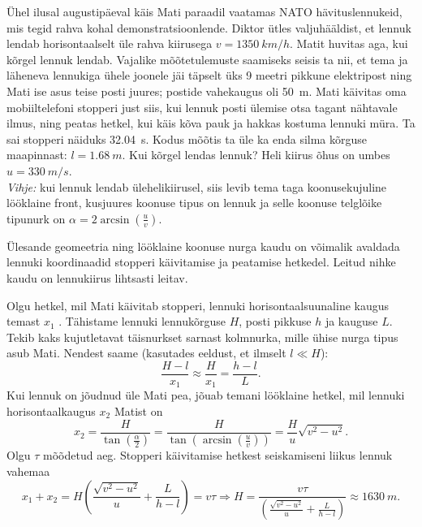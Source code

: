 
Ühel ilusal augustipäeval käis Mati paraadil vaatamas NATO hävituslennukeid, mis
tegid rahva kohal demonstratsioonlende. Diktor ütles valjuhääldist, et lennuk
lendab horisontaalselt üle rahva kiirusega $v=\SI{1350}{km/h}$. Matit huvitas aga, kui
kõrgel lennuk lendab. Vajalike mõõtetulemuste saamiseks seisis ta nii, et tema
ja läheneva lennukiga ühele joonele jäi täpselt üks 9 meetri pikkune elektripost
ning Mati ise asus teise posti juures; postide vahekaugus oli \SI{50}{m}. Mati käivitas oma
mobiiltelefoni stopperi just siis, kui lennuk posti ülemise otsa tagant nähtavale ilmus, ning 
peatas hetkel, kui käis kõva pauk ja hakkas kostuma lennuki müra. Ta sai
stopperi näiduks \SI{32,04}{s}. Kodus
mõõtis ta üle ka enda silma kõrguse maapinnast: $l=\SI{1,68}{m}$.
Kui kõrgel lendas lennuk? Heli kiirus õhus on umbes
$u=\SI{330}{m/s}$.\\ 
\textit{Vihje:} kui lennuk lendab
ülehelikiirusel, siis levib tema taga
koonusekujuline lööklaine front, kusjuures koonuse tipus on lennuk ja selle
koonuse telglõike
tipunurk on $\alpha=2\arcsin\left(\frac{u}{v}\right)$.

\hint
Ülesande geomeetria ning lööklaine koonuse nurga kaudu on võimalik avaldada lennuki koordinaadid stopperi käivitamise ja peatamise hetkedel. Leitud nihke kaudu on lennukiirus lihtsasti leitav.

\solu
Olgu hetkel, mil Mati käivitab stopperi, lennuki horisontaalsuunaline kaugus
temast $x_{1}$ . Tähistame lennuki lennukõrguse $H$, posti pikkuse $h$ ja
kauguse
$L$. Tekib kaks kujutletavat täisnurkset sarnast kolmnurka, mille ühise nurga
tipus asub Mati. Nendest saame (kasutades eeldust, et ilmselt $l\ll H$):
\[\frac{H-l}{x_{1}}\approx\frac{H}{x_{1}}=\frac{h-l}{L}. \]
Kui lennuk on jõudnud üle Mati pea, jõuab temani lööklaine hetkel, mil lennuki horisontaalkaugus $x_{2}$ Matist on
\[ x_{2}=\frac{H}{\tan\left(\frac{\alpha}{2}\right)}=\frac{H}{\tan\left(\arcsin\left(\frac{u}{v}\right)\right)}=\frac{H}{u}\sqrt{v^2-u^2}.
\]
Olgu $\tau$ mõõdetud aeg. Stopperi käivitamise hetkest seiskamiseni liikus lennuk vahemaa
\[ x_1+x_2=H\left(\frac{\sqrt{v^2-u^2}}{u} +\frac{L}{h-l}\right)=v\tau
\Rightarrow
H=\frac{v\tau}{\left(\frac{\sqrt{v^2-u^2}}{u} +\frac{L}{h-l}\right)}\approx
\SI{1630}{m}.
\]
\probend